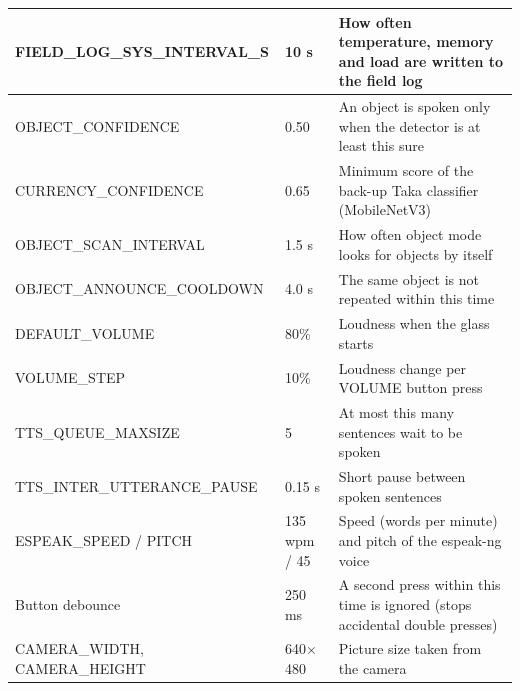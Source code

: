 \begin{table}[H]
\begin{tabular}{|L{6.4cm}|C{1.9cm}|L{5.8cm}|}
FIELD\_LOG\_SYS\_INTERVAL\_S & 10 s & How often temperature, memory and load are written to the field log \\ \hline
OBJECT\_CONFIDENCE & 0.50 & An object is spoken only when the detector is at least this sure \\ \hline
CURRENCY\_CONFIDENCE & 0.65 & Minimum score of the back-up Taka classifier (MobileNetV3) \\ \hline
OBJECT\_SCAN\_INTERVAL & 1.5 s & How often object mode looks for objects by itself \\ \hline
OBJECT\_ANNOUNCE\_COOLDOWN & 4.0 s & The same object is not repeated within this time \\ \hline
DEFAULT\_VOLUME & 80\% & Loudness when the glass starts \\ \hline
VOLUME\_STEP & 10\% & Loudness change per VOLUME button press \\ \hline
TTS\_QUEUE\_MAXSIZE & 5 & At most this many sentences wait to be spoken \\ \hline
TTS\_INTER\_UTTERANCE\_PAUSE & 0.15 s & Short pause between spoken sentences \\ \hline
ESPEAK\_SPEED / PITCH & 135 wpm / 45 & Speed (words per minute) and pitch of the espeak-ng voice \\ \hline
Button debounce & 250 ms & A second press within this time is ignored (stops accidental double presses) \\ \hline
CAMERA\_WIDTH, CAMERA\_HEIGHT & 640$\times$480 & Picture size taken from the camera \\ \hline
\end{tabular}
\end{table}

